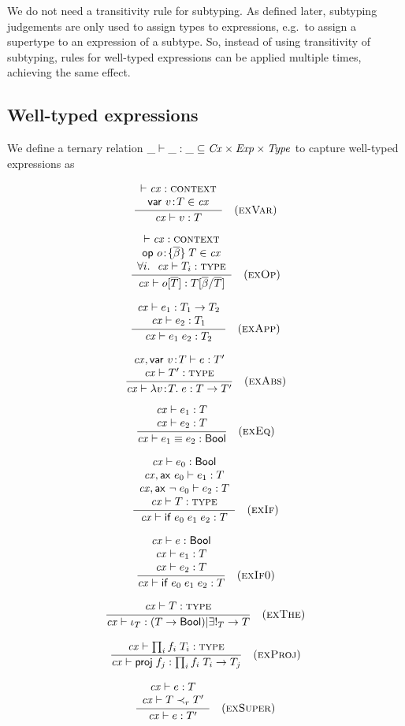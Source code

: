 We do not need a transitivity rule for subtyping. As defined later, subtyping
judgements are only used to assign types to expressions, e.g.\ to assign a
supertype to an expression of a subtype. So, instead of using transitivity of
subtyping, rules for well-typed expressions can be applied multiple times,
achieving the same effect.

\subsection{Well-typed expressions}

We define a ternary relation $\_\vdash\_:\_\subseteq\mathit{Cx}\times\mathit{Exp}\times\mathit{Type}$ to capture
well-typed expressions as

\[
\frac{\begin{array}{c}\vdash\mathit{cx}:\textsc{context}\\\mathsf{var}\ v\!:\!T\in\mathit{cx}\end{array}}{\mathit{cx}\vdash v:T}\quad\mbox{(\textsc{exVar})}
\]

\[
\frac{\begin{array}{c}\vdash\mathit{cx}:\textsc{context}\\\mathsf{op}\ o\!:\!\{\overline{\beta}\}\;T\in\mathit{cx}\\\forall i.\ \ \mathit{cx}\vdash T_i:\textsc{type}\end{array}}{\mathit{cx}\vdash o[\overline{T}]:T[\overline{\beta}/\overline{T}]}\quad\mbox{(\textsc{exOp})}
\]

\[
\frac{\begin{array}{c}\mathit{cx}\vdash e_1:T_1\to T_2\\\mathit{cx}\vdash e_2:T_1\end{array}}{\mathit{cx}\vdash e_1\;e_2:T_2}\quad\mbox{(\textsc{exApp})}
\]

\[
\frac{\begin{array}{c}\mathit{cx},\mathsf{var}\ v\!:\!T\vdash e:T'\\\mathit{cx}\vdash T':\textsc{type}\end{array}}{\mathit{cx}\vdash\lambda v\!:\!T.\;e:T\to T'}\quad\mbox{(\textsc{exAbs})}
\]

\[
\frac{\begin{array}{c}\mathit{cx}\vdash e_1:T\\\mathit{cx}\vdash e_2:T\end{array}}{\mathit{cx}\vdash e_1\equiv e_2:\mathsf{Bool}}\quad\mbox{(\textsc{exEq})}
\]

\[
\frac{\begin{array}{c}\mathit{cx}\vdash e_0:\mathsf{Bool}\\\mathit{cx},\mathsf{ax}\ e_0\vdash e_1:T\\\mathit{cx},\mathsf{ax}\ \neg\;e_0\vdash e_2:T\\\mathit{cx}\vdash T:\textsc{type}\end{array}}{\mathit{cx}\vdash\mathsf{if}\;e_0\;e_1\;e_2:T}\quad\mbox{(\textsc{exIf})}
\]

\[
\frac{\begin{array}{c}\mathit{cx}\vdash e:\mathsf{Bool}\\\mathit{cx}\vdash e_1:T\\\mathit{cx}\vdash e_2:T\end{array}}{\mathit{cx}\vdash\mathsf{if}\;e_0\;e_1\;e_2:T}\quad\mbox{(\textsc{exIf0})}
\]

\[
\frac{\begin{array}{c}\mathit{cx}\vdash T:\textsc{type}\end{array}}{\mathit{cx}\vdash\iota_{T}:(T\to\mathsf{Bool})|\exists!_{T}\to T}\quad\mbox{(\textsc{exThe})}
\]

\[
\frac{\begin{array}{c}\mathit{cx}\vdash\prod_{i}f_i\;T_i:\textsc{type}\end{array}}{\mathit{cx}\vdash\mathsf{proj}\;{f_j}:\prod_{i}f_i\;T_i\to T_j}\quad\mbox{(\textsc{exProj})}
\]



\[
\frac{\begin{array}{c}\mathit{cx}\vdash e:T\\\mathit{cx}\vdash T\prec_{r}T'\end{array}}{\mathit{cx}\vdash e:T'}\quad\mbox{(\textsc{exSuper})}
\]

